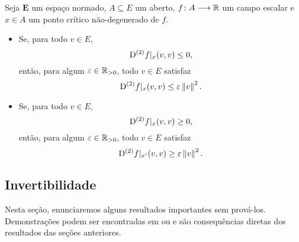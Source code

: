 \begin{proposition}
Seja $\bm E$ um espaço normado, $A \subseteq E$ um aberto, $f\colon \allowbreak A \longrightarrow \mathbb{R}$ um campo escalar e $x \in A$ um ponto crítico não-degenerado de $f$.
	\begin{itemize}
		\item Se, para todo $v \in E$,
			\begin{equation*}
			\mathrm{D}^{(2)} f|_x(v,v) \leq 0,
			\end{equation*}
		então, para algum $\varepsilon \in \mathbb{R}_{>0}$, todo $v \in E$ satisfaz
			\begin{equation*}
			\mathrm{D}^{(2)} f|_x(v,v) \leq \varepsilon \left\Vert{v}\right\Vert^2.
			\end{equation*}
		\item Se, para todo $v \in E$,
			\begin{equation*}
			\mathrm{D}^{(2)} f|_x(v,v) \geq 0,
			\end{equation*}
		então, para algum $\varepsilon \in \mathbb{R}_{>0}$, todo $v \in E$ satisfaz
			\begin{equation*}
			\mathrm{D}^{(2)} f|_{x'}(v,v) \geq \varepsilon \left\Vert{v}\right\Vert^2.
			\end{equation*}
	\end{itemize}
\end{proposition}















\subsection{Invertibilidade}

Nesta seção, enunciaremos alguns resultados importantes sem prová-los. Demonstrações podem ser encontradas em \cite{liv:Cartan-DifferentialCalculus} ou \cite{liv:Coleman-CalculusNormedVectorSpaces} e são consequências diretas dos resultados das seções anteriores.

